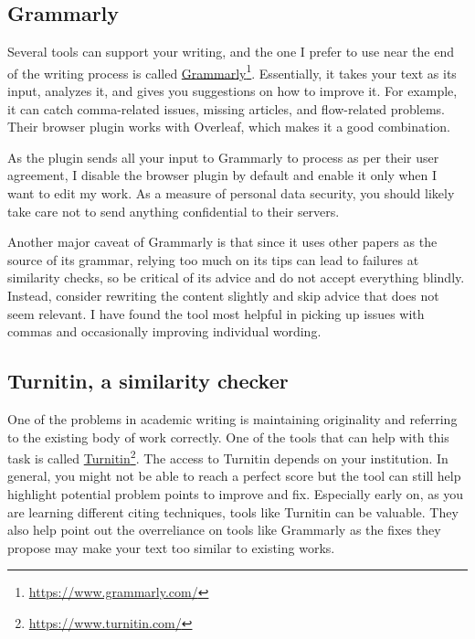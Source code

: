 \subsection{Grammarly}

Several tools can support your writing, and the one I prefer to use near the end of the writing process is called \href{https://www.grammarly.com/}{Grammarly}\footnote{\url{https://www.grammarly.com/}}.
Essentially, it takes your text as its input, analyzes it, and gives you suggestions on how to improve it.
For example, it can catch comma-related issues, missing articles, and flow-related problems.
Their browser plugin works with Overleaf, which makes it a good combination.

As the plugin sends all your input to Grammarly to process as per their user agreement, I disable the browser plugin by default and enable it only when I want to edit my work.
As a measure of personal data security, you should likely take care not to send anything confidential to their servers.

Another major caveat of Grammarly is that since it uses other papers as the source of its grammar, relying too much on its tips can lead to failures at similarity checks, so be critical of its advice and do not accept everything blindly.
Instead, consider rewriting the content slightly and skip advice that does not seem relevant.
I have found the tool most helpful in picking up issues with commas and occasionally improving individual wording.

\subsection{Turnitin, a similarity checker}

One of the problems in academic writing is maintaining originality and referring to the existing body of work correctly.
One of the tools that can help with this task is called \href{https://www.turnitin.com/}{Turnitin}\footnote{\url{https://www.turnitin.com/}}.
The access to Turnitin depends on your institution. In general, you might not be able to reach a perfect score but the tool can still help highlight potential problem points to improve and fix.
Especially early on, as you are learning different citing techniques, tools like Turnitin can be valuable.
They also help point out the overreliance on tools like Grammarly as the fixes they propose may make your text too similar to existing works.


